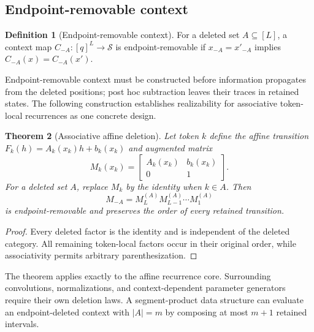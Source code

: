 \documentclass[10pt]{article}
\newtheorem{theorem}{Theorem}[section]
\theoremstyle{definition}
\newtheorem{definition}[theorem]{Definition}
\theoremstyle{remark}
\newcommand{\BookInsert}[1]{}
\newcommand{\BookOnlyChapter}[1]{}
\newcommand{\BookChapterLabel}[1]{}
\newcommand{\BookSection}[1]{\subsection{#1}}
\begin{document}
\BookInsert{chapters/12_rfd4_latent_relational_case}
\BookInsert{chapters/12_architecture_coda}
\BookOnlyChapter{Conditional Realizability and Information Limits}
\BookChapterLabel{chap:book-conditional-limits}
\BookInsert{chapters/13_conditional_realizability_opening}

\BookSection{Endpoint-removable context}

\begin{definition}[Endpoint-removable context]
For a deleted set $A\subseteq[L]$, a context map $C_{-A}:[q]^L\to\mathcal S$ is
endpoint-removable if $x_{-A}=x'_{-A}$ implies $C_{-A}(x)=C_{-A}(x')$.
\end{definition}

Endpoint-removable context must be constructed before information propagates from the deleted
positions; post hoc subtraction leaves their traces in retained states.  The following construction
establishes realizability for associative token-local recurrences as one concrete design.

\begin{theorem}[Associative affine deletion]
\label{thm:affine-deletion}
Let token $k$ define the affine transition
$F_k(h)=A_k(x_k)h+b_k(x_k)$ and augmented matrix
\begin{equation}
M_k(x_k)=
\begin{bmatrix}A_k(x_k)&b_k(x_k)\\0&1\end{bmatrix}.
\end{equation}
For a deleted set $A$, replace $M_k$ by the identity when $k\in A$.  Then
\begin{equation}
M_{-A}=M_L^{(A)}M_{L-1}^{(A)}\cdots M_1^{(A)}
\label{eq:affine-deletion}
\end{equation}
is endpoint-removable and preserves the order of every retained transition.
\end{theorem}

\begin{proof}
Every deleted factor is the identity and is independent of the deleted category.  All remaining
token-local factors occur in their original order, while associativity permits arbitrary
parenthesization.
\end{proof}

The theorem applies exactly to the affine recurrence core.  Surrounding convolutions,
normalizations, and context-dependent parameter generators require their own deletion laws.  A segment-product data structure can
evaluate an endpoint-deleted context with $|A|=m$ by composing at most $m+1$ retained intervals.
\end{document}
